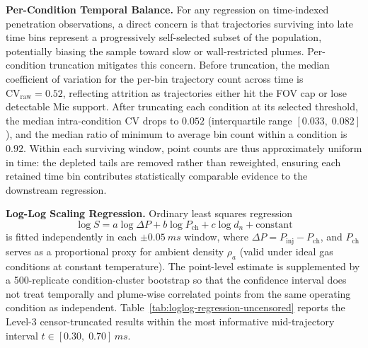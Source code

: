 \textbf{Per-Condition Temporal Balance.}
For any regression on time-indexed penetration observations, a direct concern is that trajectories surviving into late time bins represent a progressively self-selected subset of the population, potentially biasing the sample toward slow or wall-restricted plumes. Per-condition truncation mitigates this concern. Before truncation, the median coefficient of variation for the per-bin trajectory count across time is $\mathrm{CV}_{\mathrm{raw}}=0.52$, reflecting attrition as trajectories either hit the FOV cap or lose detectable Mie support. After truncating each condition at its selected threshold, the median intra-condition CV drops to $\num{0.052}$ (interquartile range $[0.033,\;0.082]$), and the median ratio of minimum to average bin count within a condition is $0.92$. Within each surviving window, point counts are thus approximately uniform in time: the depleted tails are removed rather than reweighted, ensuring each retained time bin contributes statistically comparable evidence to the downstream regression.

\newpage
\textbf{Log-Log Scaling Regression.}
Ordinary least squares regression
\[
  \log S = a\log\Delta P + b\log P_{\mathrm{ch}} + c\log d_n + \mathrm{constant}
\]
is fitted independently in each \(\pm\SI{0.05}{ms}\) window, where $\Delta P = P_{\mathrm{inj}}-P_{\mathrm{ch}}$, and $P_{\mathrm{ch}}$ serves as a proportional proxy for ambient density $\rho_a$ (valid under ideal gas conditions at constant temperature). The point-level estimate is supplemented by a 500-replicate condition-cluster bootstrap so that the confidence interval does not treat temporally and plume-wise correlated points from the same operating condition as independent. Table~\ref{tab:loglog-regression-uncensored} reports the Level-3 censor-truncated results within the most informative mid-trajectory interval $t\in[0.30,\;0.70]\,\si{ms}$.

